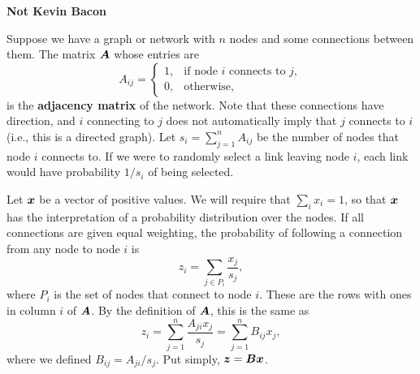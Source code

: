 \documentclass[11pt,twoside]{article}
\begin{document}
    
\begin{center}
  \bf Not Kevin Bacon
\end{center}
    
Suppose we have a graph or network with $n$ nodes and some connections between them. The matrix $\bm{A}$ whose entries are 
\begin{equation}
  A_{ij} = 
  \begin{cases}
    1, & \text{if node $i$ connects to $j$},\\
    0, & \text{otherwise,}
  \end{cases}
\end{equation}
is the \textbf{adjacency matrix} of the network. Note that these connections have direction, and $i$ connecting to $j$ does not automatically imply that $j$ connects to $i$ (i.e., this is a directed graph). Let $s_i = \sum_{j=1}^n A_{ij}$ be the number of nodes that node $i$ connects to. If we were to randomly select a link leaving node $i$, each link would have probability $1/s_i$ of being selected. 
     
Let $\bm{x}$ be a vector of positive values. We will require that $\sum_i x_i = 1$, so that $\bm{x}$ has the interpretation of a probability distribution over the nodes. If all connections are given equal weighting, the probability of following a connection from any node to node $i$ is
\begin{equation}
  z_i = \sum_{j\in P_i} \frac{x_j}{s_j} ,
\end{equation} 
where $P_i$ is the set of nodes that connect to node $i$. These are the rows with ones in column $i$ of $\bm{A}$. By the definition of $\bm{A}$, this is the same as  
\begin{equation}
  \label{eq:yvec}
  z_i = \sum_{j=1}^n \frac{A_{ji} x_j}{s_j} =\sum_{j=1}^n B_{ij} x_j,
\end{equation} 
where we defined $B_{ij}=A_{ji}/s_j$. Put simply, $\bm{z}=\bm{B} \bm{x}$. 
\end{document}
